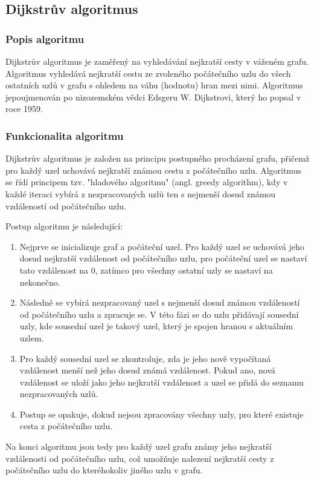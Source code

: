 \documentclass[12pt, titlepage, a4paper]{article}
\begin{document}
\subsection{Dijkstrův algoritmus}
\subsubsection{Popis algoritmu}
Dijkstrův algoritmus je zaměřený na vyhledávání nejkratší cesty v váženém grafu. Algoritmus 
vyhledává nejkratší cestu ze zvoleného počátečního uzlu do všech ostatních uzlů v grafu s 
ohledem na váhu (hodnotu) hran mezi nimi. Algoritmus jepoujmenován po nizozemském vědci 
Edsgeru W. Dijkstrovi, který ho popsal v roce 1959.
~\cite{GeeksforGeeks: Dijkstra,programiz: Dijkstra}
\subsubsection{Funkcionalita algoritmu}
Dijkstrův algoritmus je založen na principu postupného procházení grafu, přičemž pro každý 
uzel uchovává nejkratší známou cestu z počátečního uzlu. Algoritmus se řídí principem tzv. 
"hladového algoritmu" (angl. greedy algorithm), kdy v každé iteraci vybírá z nezpracovaných 
uzlů ten s nejmenší dosud známou vzdáleností od počátečního uzlu.

Postup algoritmu je následující:

\begin{enumerate}
    \item Nejprve se inicializuje graf a počáteční uzel. Pro každý uzel se uchovává jeho 
    dosud nejkratší vzdálenost od počátečního uzlu, pro počáteční uzel se nastaví tato 
    vzdálenost na 0, zatímco pro všechny ostatní uzly se nastaví na nekonečno.

    \item Následně se vybírá nezpracovaný uzel s nejmenší dosud známou vzdáleností od 
    počátečního uzlu a zpracuje se. V této fázi se do uzlu přidávají sousední uzly, kde 
    sousední uzel je takový uzel, který je spojen hranou s aktuálním uzlem.
    
    \item Pro každý sousední uzel se zkontroluje, zda je jeho nově vypočítaná vzdálenost 
    menší než jeho dosud známá vzdálenost. Pokud ano, nová vzdálenost se uloží jako jeho 
    nejkratší vzdálenost a uzel se přidá do seznamu nezpracovaných uzlů.
    
    \item Postup se opakuje, dokud nejsou zpracovány všechny uzly, pro které existuje 
    cesta z počátečního uzlu.
\end{enumerate}
Na konci algoritmu jsou tedy pro každý uzel grafu známy jeho nejkratší vzdálenosti od 
počátečního uzlu, což umožňuje nalezení nejkratší cesty z počátečního uzlu do kteréhokoliv 
jiného uzlu v grafu.
~\cite{GeeksforGeeks: Dijkstra,programiz: Dijkstra}
\end{document}
